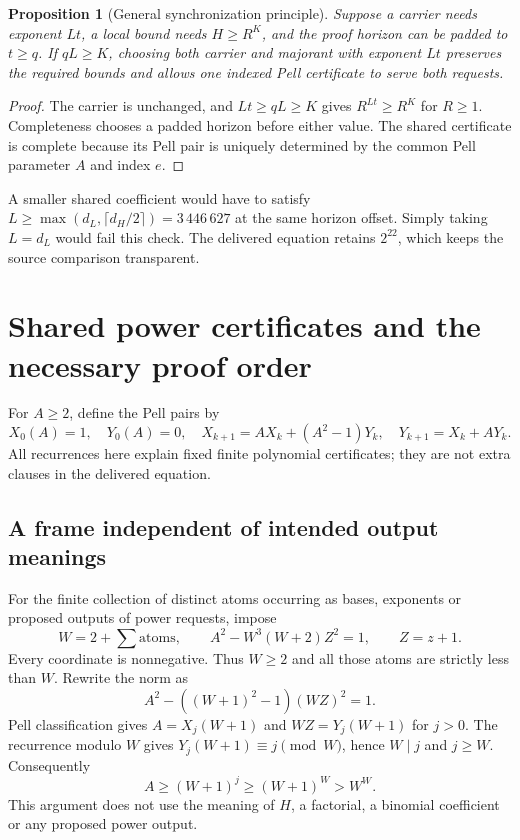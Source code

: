 \documentclass[11pt]{article}
\newtheorem{proposition}[theorem]{Proposition}
\theoremstyle{definition}\newtheorem{definition}[theorem]{Definition}
\begin{document}
\begin{proposition}[General synchronization principle]
Suppose a carrier needs exponent $Lt$, a local bound needs $H\ge R^K$,
and the proof horizon can be padded to $t\ge q$. If $qL\ge K$, choosing
both carrier and majorant with exponent $Lt$ preserves the required
bounds and allows one indexed Pell certificate to serve both requests.
\end{proposition}
\begin{proof}
The carrier is unchanged, and $Lt\ge qL\ge K$ gives $R^{Lt}\ge R^K$
for $R\ge1$. Completeness chooses a padded horizon before either value.
The shared certificate is complete because its Pell pair is uniquely
determined by the common Pell parameter $A$ and index $e$.
\end{proof}
A smaller shared coefficient would have to satisfy
$L\ge\max(d_L,\lceil d_H/2\rceil)=3\,446\,627$ at the same horizon
offset. Simply taking $L=d_L$ would fail this check. The delivered
equation retains $2^{22}$, which keeps the source comparison transparent.

\section{Shared power certificates and the necessary proof order}
For $A\ge2$, define the Pell pairs by
\[
 X_0(A)=1,\quad Y_0(A)=0,\quad
 X_{k+1}=AX_k+(A^2-1)Y_k,\quad Y_{k+1}=X_k+AY_k.
\]
All recurrences here explain fixed finite polynomial certificates; they
are not extra clauses in the delivered equation.

\subsection{A frame independent of intended output meanings}
For the finite collection of distinct atoms occurring as bases, exponents
or proposed outputs of power requests, impose
\begin{equation}\label{eq:frame}
 W=2+\sum\text{atoms},\qquad
 A^2-W^3(W+2)Z^2=1,\qquad Z=z+1.
\end{equation}
Every coordinate is nonnegative. Thus $W\ge2$ and all those atoms are
strictly less than $W$. Rewrite the norm as
\[
 A^2-((W+1)^2-1)(WZ)^2=1.
\]
Pell classification gives $A=X_j(W+1)$ and $WZ=Y_j(W+1)$ for $j>0$.
The recurrence modulo $W$ gives $Y_j(W+1)\equiv j\pmod W$, hence
$W\mid j$ and $j\ge W$. Consequently
\begin{equation}\label{eq:framebound}
 A\ge(W+1)^j\ge(W+1)^W>W^W.
\end{equation}
This argument does not use the meaning of $H$, a factorial, a binomial
coefficient or any proposed power output.
\end{document}
